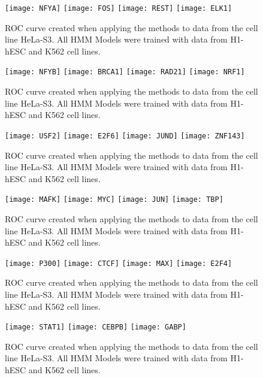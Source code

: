 \documentclass[11pt,a4]{article}
\begin{document}
\begin{figure}[h]
\centering
    \texttt{[image: NFYA]}
    \texttt{[image: FOS]}
    \texttt{[image: REST]}
    \texttt{[image: ELK1]}
\caption{ROC curve created when applying the methods to data from the cell line HeLa-S3. All HMM Models were trained with data from H1-hESC and K562 cell lines.}
\label{fig:roc.HeLaS3.fdr_4.1}
\end{figure}

\begin{figure}[h]
\centering
    \texttt{[image: NFYB]}
    \texttt{[image: BRCA1]}
    \texttt{[image: RAD21]}
    \texttt{[image: NRF1]}
\caption{ROC curve created when applying the methods to data from the cell line HeLa-S3. All HMM Models were trained with data from H1-hESC and K562 cell lines.}
\label{fig:roc.HeLaS3.fdr_4.2}
\end{figure}

\begin{figure}[h]
\centering
    \texttt{[image: USF2]}
    \texttt{[image: E2F6]}
    \texttt{[image: JUND]}
    \texttt{[image: ZNF143]}
\caption{ROC curve created when applying the methods to data from the cell line HeLa-S3. All HMM Models were trained with data from H1-hESC and K562 cell lines.}
\label{fig:roc.HeLaS3.fdr_4.3}
\end{figure}

\begin{figure}[h]
\centering
    \texttt{[image: MAFK]}
    \texttt{[image: MYC]}
    \texttt{[image: JUN]}
    \texttt{[image: TBP]}
\caption{ROC curve created when applying the methods to data from the cell line HeLa-S3. All HMM Models were trained with data from H1-hESC and K562 cell lines.}
\label{fig:roc.HeLaS3.fdr_4.4}
\end{figure}

\begin{figure}[h]
\centering
    \texttt{[image: P300]}
    \texttt{[image: CTCF]}
    \texttt{[image: MAX]}
    \texttt{[image: E2F4]}
\caption{ROC curve created when applying the methods to data from the cell line HeLa-S3. All HMM Models were trained with data from H1-hESC and K562 cell lines.}
\label{fig:roc.HeLaS3.fdr_4.5}
\end{figure}

\begin{figure}[h]
\centering
    \texttt{[image: STAT1]}
    \texttt{[image: CEBPB]}
    \texttt{[image: GABP]}
\caption{ROC curve created when applying the methods to data from the cell line HeLa-S3. All HMM Models were trained with data from H1-hESC and K562 cell lines.}
\label{fig:roc.HeLaS3.fdr_4.6}
\end{figure}
\end{document}
